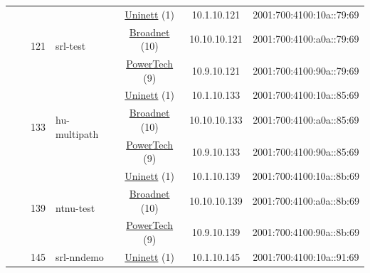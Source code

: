 \begin{small}
\begin{center}
\begin{longtable}{|c|c|c|c|c|c|c|c|}
  &  & \multirow{3}{*}{\tiny{121}} & \multicolumn{1}{|l|}{\multirow{3}{*}{\tiny{srl-test}}} & \multicolumn{2}{|c|}{\tiny{\href{https://www.uninett.no}{Uninett} (1)}} & \tiny{10.1.10.121} & \tiny{2001:700:4100:10a::79:69} \\* \cline{5-5}\cline{6-6}\cline{7-7}\cline{8-8}
  &  &  &  & \multicolumn{2}{|c|}{\tiny{\href{https://www.broadnet.no}{Broadnet} (10)}} & \tiny{10.10.10.121} & \tiny{2001:700:4100:a0a::79:69} \\* \cline{5-5}\cline{6-6}\cline{7-7}\cline{8-8}
  &  &  &  & \multicolumn{2}{|c|}{\tiny{\href{http://www.powertech.no}{PowerTech} (9)}} & \tiny{10.9.10.121} & \tiny{2001:700:4100:90a::79:69} \\* \cline{3-3}\cline{4-4}\cline{5-5}\cline{6-6}\cline{7-7}\cline{8-8}
  &  & \multirow{3}{*}{\tiny{133}} & \multicolumn{1}{|l|}{\multirow{3}{*}{\tiny{hu-multipath}}} & \multicolumn{2}{|c|}{\tiny{\href{https://www.uninett.no}{Uninett} (1)}} & \tiny{10.1.10.133} & \tiny{2001:700:4100:10a::85:69} \\* \cline{5-5}\cline{6-6}\cline{7-7}\cline{8-8}
  &  &  &  & \multicolumn{2}{|c|}{\tiny{\href{https://www.broadnet.no}{Broadnet} (10)}} & \tiny{10.10.10.133} & \tiny{2001:700:4100:a0a::85:69} \\* \cline{5-5}\cline{6-6}\cline{7-7}\cline{8-8}
  &  &  &  & \multicolumn{2}{|c|}{\tiny{\href{http://www.powertech.no}{PowerTech} (9)}} & \tiny{10.9.10.133} & \tiny{2001:700:4100:90a::85:69} \\* \cline{3-3}\cline{4-4}\cline{5-5}\cline{6-6}\cline{7-7}\cline{8-8}
  &  & \multirow{3}{*}{\tiny{139}} & \multicolumn{1}{|l|}{\multirow{3}{*}{\tiny{ntnu-test}}} & \multicolumn{2}{|c|}{\tiny{\href{https://www.uninett.no}{Uninett} (1)}} & \tiny{10.1.10.139} & \tiny{2001:700:4100:10a::8b:69} \\* \cline{5-5}\cline{6-6}\cline{7-7}\cline{8-8}
  &  &  &  & \multicolumn{2}{|c|}{\tiny{\href{https://www.broadnet.no}{Broadnet} (10)}} & \tiny{10.10.10.139} & \tiny{2001:700:4100:a0a::8b:69} \\* \cline{5-5}\cline{6-6}\cline{7-7}\cline{8-8}
  &  &  &  & \multicolumn{2}{|c|}{\tiny{\href{http://www.powertech.no}{PowerTech} (9)}} & \tiny{10.9.10.139} & \tiny{2001:700:4100:90a::8b:69} \\* \cline{3-3}\cline{4-4}\cline{5-5}\cline{6-6}\cline{7-7}\cline{8-8}
  &  & \multirow{3}{*}{\tiny{145}} & \multicolumn{1}{|l|}{\multirow{3}{*}{\tiny{srl-nndemo}}} & \multicolumn{2}{|c|}{\tiny{\href{https://www.uninett.no}{Uninett} (1)}} & \tiny{10.1.10.145} & \tiny{2001:700:4100:10a::91:69} \\* \cline{5-5}\cline{6-6}\cline{7-7}\cline{8-8}

\end{longtable}
\end{center}
\end{small}
